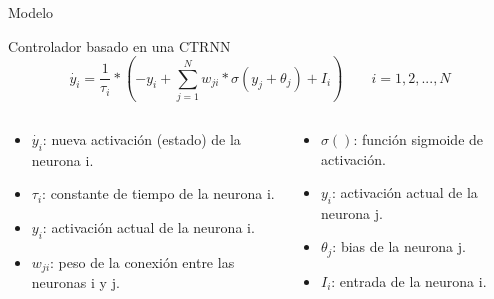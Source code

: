 \documentclass[aspectratio=169]{beamer}
\begin{document}
\begin{frame}{Modelo}
  \begin{block}{Controlador basado en una CTRNN}
    \begin{equation*}
    	\dot{y_{i}}= \frac{1}{\tau_{i}} * \left ( -y_{i}+\sum_{j=1}^{N}w_{ji}*\sigma \left ( y_{j} + \theta _{j} \right ) + I_{i} \right ) \qquad i =1,2,...,N
    \end{equation*}
    \begin{columns}
      \begin{column}{0.47\textwidth}
          \begin{itemize}
            \item $\dot{y_{i}}$: nueva activación (estado) de la neurona i.
            \item $\tau_{i}$: constante de tiempo de la neurona i.
            \item $y_{i}$: activación actual de la neurona i.
            \item $w_{ji}$: peso de la conexión entre las neuronas i y j.
          \end{itemize}
      \end{column}
      \begin{column}{0.5\textwidth}
        \begin{itemize}
          \item $\sigma ()$: función sigmoide de activación.
          \item $y_{i}$: activación actual de la neurona j.
          \item $\theta_{j}$: bias de la neurona j.
          \item $I_{i}$: entrada de la neurona i.
        \end{itemize}
      \end{column}
    \end{columns}
  \end{block}
\end{frame}
\end{document}
